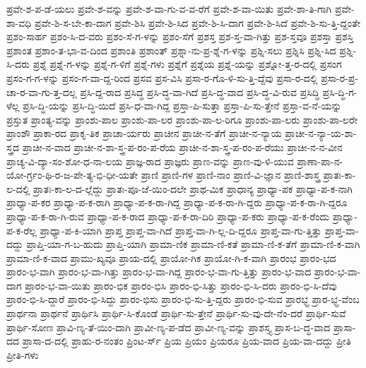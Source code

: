 {ಪ್ರವೇ-ಶ-ಪ-ಡೆ-ಯಲು
ಪ್ರವೇ-ಶ-ವನ್ನು
ಪ್ರವೇ-ಶ-ವಾ-ಗು-ವ-ವ-ರೆಗೆ
ಪ್ರವೇ-ಶ-ವಾ-ಯಿತು
ಪ್ರವೇ-ಶಾ-ತಿ-ಗಾಗಿ
ಪ್ರವೇ-ಶಾ-ವಧಿ
ಪ್ರವೇ-ಶಿ-ಸ-ಬೇ-ಕಾ-ದಾಗ
ಪ್ರವೇ-ಶಿಸಿ
ಪ್ರವೇ-ಶಿ-ಸಿದ
ಪ್ರವೇ-ಶಿ-ಸಿ-ದಾಗ
ಪ್ರವೇ-ಶಿ-ಸಿದೆ
ಪ್ರವೇ-ಶಿ-ಸು-ತ್ತಿ-ದ್ದಂತೇ
ಪ್ರಶಂ-ಸಾರ್ಹ
ಪ್ರಶಂ-ಸಿ-ದ-ವರು
ಪ್ರಶಂ-ಸೆ-ಗ-ಳನ್ನು
ಪ್ರಶಂ-ಸೆಗೆ
ಪ್ರಶಸ್ತ
ಪ್ರಶ-ಸ್ತ-ವಾ-ಗಿತ್ತು
ಪ್ರಶ-ಸ್ತವೂ
ಪ್ರಶಸ್ತಾ
ಪ್ರಶಸ್ತಿ
ಪ್ರಶಾಂತ
ಪ್ರಶಾಂ-ತ-ಭಾ-ವ-ದಿಂದ
ಪ್ರಶಾಂತಿ
ಪ್ರಶಾಂತ್
ಪ್ರಶ್ನಾ-ನು-ಪ್ರ-ಶ್ನೆ-ಗ-ಳನ್ನು
ಪ್ರಶ್ನಿ-ಸಲು
ಪ್ರಶ್ನಿಸಿ
ಪ್ರಶ್ನಿ-ಸಿದ
ಪ್ರಶ್ನಿ-ಸಿ-ದರು
ಪ್ರಶ್ನೆ
ಪ್ರಶ್ನೆ-ಗ-ಳನ್ನು
ಪ್ರಶ್ನೆ-ಗ-ಳಿಗೆ
ಪ್ರಶ್ನೆ-ಗಳು
ಪ್ರಶ್ನೆಗೆ
ಪ್ರಶ್ನೆಯ
ಪ್ರಶ್ನೆ-ಯನ್ನು
ಪ್ರಶ್ನೋ-ತ್ತ-ರ-ದಲ್ಲಿ
ಪ್ರಸಂಗ
ಪ್ರಸಂ-ಗ-ಗ-ಳನ್ನು
ಪ್ರಸಂ-ಗ-ವಾ-ದ್ದ-ರಿಂದ
ಪ್ರಸವ
ಪ್ರಸ-ವಿಸಿ
ಪ್ರಸಾ-ರ-ಗೊ-ಳಿ-ಸು-ತ್ತಿ-ದ್ದೆವು
ಪ್ರಸಾ-ರ-ದಲ್ಲಿ
ಪ್ರಸಾ-ರ-ಪ್ರ-ಚಾ-ರ-ವಾ-ಗು-ತ್ತ-ದಲ್ಲ
ಪ್ರಸಿ-ದ್ದ-ರಾದ
ಪ್ರಸಿದ್ಧ
ಪ್ರಸಿ-ದ್ಧ-ವಾ-ಗಿದೆ
ಪ್ರಸಿ-ದ್ಧ-ವಾದ
ಪ್ರಸಿ-ದ್ಧ-ವಿ-ರುವ
ಪ್ರಸಿದ್ಧಿ
ಪ್ರಸಿ-ದ್ಧಿ-ಗ-ಳೆಲ್ಲ
ಪ್ರಸಿ-ದ್ಧಿ-ಯನ್ನು
ಪ್ರಸಿ-ದ್ಧಿ-ಯಿದೆ
ಪ್ರಸಿ-ಧ-ವಾ-ಗಿದ್ದ
ಪ್ರಸ್ತಾ-ಪಿ-ಸುತ್ತಾ
ಪ್ರಸ್ತಾ-ಪಿ-ಸು-ತ್ತೇನೆ
ಪ್ರಸ್ತಾ-ವ-ನೆ-ಯನ್ನು
ಪ್ರಸ್ತುತ
ಪ್ರಾಂತ್ಯ-ವನ್ನು
ಪ್ರಾಂಶು-ಪಾಲ
ಪ್ರಾಂಶು-ಪಾ-ಲರ
ಪ್ರಾಂಶು-ಪಾ-ಲ-ರಿಗೂ
ಪ್ರಾಂಶು-ಪಾ-ಲರು
ಪ್ರಾಂಶು-ಪಾ-ಲರೇ
ಪ್ರಾಂಶೌ
ಪ್ರಾಕಾ-ರದ
ಪ್ರಾಕೃ-ತಿಕ
ಪ್ರಾಚಾ-ರ್ಯರು
ಪ್ರಾಚೀನ
ಪ್ರಾಚೀ-ನ-ತೆಗೆ
ಪ್ರಾಚೀ-ನ-ನ್ಯಾಯ
ಪ್ರಾಚೀ-ನ-ನ್ಯಾ-ಯ-ಶಾ-ಸ್ತ್ರದ
ಪ್ರಾಚೀ-ನ-ವಾದ
ಪ್ರಾಚೀ-ನ-ಶಾ-ಸ್ತ್ರ-ಪ-ರಂ-ಪ-ರೆಯ
ಪ್ರಾಚೀ-ನ-ಶಾ-ಸ್ತ್ರ-ಪ-ರಂ-ಪ-ರೆಯು
ಪ್ರಾಚೀ-ನ-ನ-ವೀನ
ಪ್ರಾಚ್ಯ-ವಿ-ದ್ಯಾ-ಸಂ-ಶೋ-ಧ-ನಾ-ಲಯ
ಪ್ರಾಜ್ಞ-ರಾದ
ಪ್ರಾಜ್ಞರು
ಪ್ರಾಣ-ವನ್ನು
ಪ್ರಾಣ-ವು-ಳಿ-ಯುವ
ಪ್ರಾಣಾ-ಪಾ-ನ-ಯೋ-ರ್ಗ್ರಂ-ಥಿ-ರ-ಜ-ಪೇ-ತ್ಯ-ಭಿ-ಧೀ-ಯತೇ
ಪ್ರಾಣಿ
ಪ್ರಾಣಿ-ಗಳ
ಪ್ರಾಣಿ-ನಾಂ
ಪ್ರಾಣಿ-ವಿ-ಜ್ಞಾನ
ಪ್ರಾಣಿ-ಶಾಸ್ತ್ರ
ಪ್ರಾತಃ-ಕಾ-ಲ-ದಲ್ಲಿ
ಪ್ರಾತಃ-ಕಾ-ಲ-ದ-ಲ್ಲೆದ್ದು
ಪ್ರಾತಃ-ಪೂ-ಜೆ-ಯಿಂ-ದಲೇ
ಪ್ರಾಥ-ಮಿಕ
ಪ್ರಾಧಾನ್ಯ
ಪ್ರಾಧ್ಯಾ-ಪಕ
ಪ್ರಾಧ್ಯಾ-ಪ-ಕ-ನಾಗಿ
ಪ್ರಾಧ್ಯಾ-ಪ-ಕರ
ಪ್ರಾಧ್ಯಾ-ಪ-ಕ-ರಾಗಿ
ಪ್ರಾಧ್ಯಾ-ಪ-ಕ-ರಾ-ಗಿದ್ದ
ಪ್ರಾಧ್ಯಾ-ಪ-ಕ-ರಾ-ಗಿ-ದ್ದರು
ಪ್ರಾಧ್ಯಾ-ಪ-ಕ-ರಾ-ಗಿ-ದ್ದರೂ
ಪ್ರಾಧ್ಯಾ-ಪ-ಕ-ರಾ-ಗಿ-ರುವ
ಪ್ರಾಧ್ಯಾ-ಪ-ಕ-ರಾದ
ಪ್ರಾಧ್ಯಾ-ಪ-ಕ-ರಾ-ದಿರಿ
ಪ್ರಾಧ್ಯಾ-ಪ-ಕರು
ಪ್ರಾಧ್ಯಾ-ಪ-ಕ-ರೆಂದು
ಪ್ರಾಧ್ಯಾ-ಪ-ಕ-ರೆಲ್ಲ
ಪ್ರಾಧ್ಯಾ-ಪ-ಕಿ-ಯಾಗಿ
ಪ್ರಾಪ್ತ
ಪ್ರಾಪ್ತ-ವಾ-ಗಿದೆ
ಪ್ರಾಪ್ತ-ವಾ-ಗಿ-ಲ್ಲ-ದಿ-ದ್ದರೂ
ಪ್ರಾಪ್ತ-ವಾ-ಗು-ತ್ತಿತ್ತು
ಪ್ರಾಪ್ತ-ವಾ-ದದ್ದು
ಪ್ರಾಪ್ತಿ-ಯಾ-ಗ-ಬ-ಹುದು
ಪ್ರಾಪ್ತಿ-ಯಾಗಿ
ಪ್ರಾಮಾ-ಣಿಕ
ಪ್ರಾಮಾ-ಣಿ-ಕತೆ
ಪ್ರಾಮಾ-ಣಿ-ಕ-ತೆಗೆ
ಪ್ರಾಮಾ-ಣಿ-ಕ-ವಾಗಿ
ಪ್ರಾಮಾ-ಣಿ-ಕ-ವಾದ
ಪ್ರಾಮು-ಖ್ಯವೂ
ಪ್ರಾಯ-ದಲ್ಲಿ
ಪ್ರಾಯೋ-ಗಿಕ
ಪ್ರಾಯೋ-ಗಿ-ಕ-ವಾಗಿ
ಪ್ರಾರಂಭ
ಪ್ರಾರಂ-ಭದ
ಪ್ರಾರಂ-ಭ-ವಾಗಿ
ಪ್ರಾರಂ-ಭ-ವಾ-ಗಿತ್ತು
ಪ್ರಾರಂ-ಭ-ವಾ-ಗಿದ್ದ
ಪ್ರಾರಂ-ಭ-ವಾ-ಗು-ತ್ತಿತ್ತು
ಪ್ರಾರಂ-ಭ-ವಾದ
ಪ್ರಾರಂ-ಭ-ವಾ-ದಾಗ
ಪ್ರಾರಂ-ಭ-ವಾ-ಯಿತು
ಪ್ರಾರಂ-ಭಿಕ
ಪ್ರಾರಂ-ಭಿಸಿ
ಪ್ರಾರಂ-ಭಿ-ಸಿತ್ತು
ಪ್ರಾರಂ-ಭಿ-ಸಿ-ದರು
ಪ್ರಾರಂ-ಭಿ-ಸಿ-ದೆವು
ಪ್ರಾರಂ-ಭಿ-ಸಿ-ದ್ದಾರೆ
ಪ್ರಾರಂ-ಭಿ-ಸಿದ್ದು
ಪ್ರಾರಂ-ಭಿಸು
ಪ್ರಾರಂ-ಭಿ-ಸು-ತ್ತಿ-ದ್ದರು
ಪ್ರಾರಂ-ಭಿ-ಸುವ
ಪ್ರಾರಭ್ಧ
ಪ್ರಾರ-ಭ್ಧ-ವೆಂಬ
ಪ್ರಾರ್ಥನಾ
ಪ್ರಾರ್ಥನೆ
ಪ್ರಾರ್ಥಿಸಿ
ಪ್ರಾರ್ಥಿ-ಸಿ-ಕೊಂಡೆ
ಪ್ರಾರ್ಥಿ-ಸು-ತ್ತೇನೆ
ಪ್ರಾರ್ಥಿ-ಸು-ವು-ದೇ-ನೆಂ-ದರೆ
ಪ್ರಾರ್ಥಿ-ಸುವೆ
ಪ್ರಾರ್ಥಿ-ಸೋಣ
ಪ್ರಾವಿ-ಣ್ಯ-ತೆ-ಯಿಂ-ದಾಗಿ
ಪ್ರಾವೀ-ಣ್ಯ-ಪ-ಡೆದ
ಪ್ರಾವೀ-ಣ್ಯ-ವನ್ನು
ಪ್ರಾಶಸ್ತ್ಯ
ಪ್ರಾಸ-ಬ-ದ್ಧ-ವಾದ
ಪ್ರಾಸಾ-ದದ
ಪ್ರಾಸಾ-ದ-ದಲ್ಲಿ
ಪ್ರಾಹು-ರ-ನಂತಂ
ಪ್ರಿಂಟ-ರ್ಸ್
ಪ್ರಿಯ
ಪ್ರಿಯಂ
ಪ್ರಿಯರೂ
ಪ್ರಿಯ-ವಾದ
ಪ್ರಿಯ-ವಾ-ದದ್ದು
ಪ್ರೀತಿ
ಪ್ರೀತಿ-ಗಳು
}
